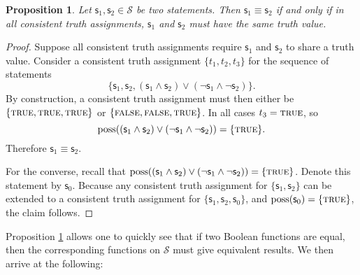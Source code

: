 \documentclass[psamsfonts]{amsart}
\newtheorem{prop}[thm]{Proposition}
\theoremstyle{definition}
\theoremstyle{remark}
\numberwithin{equation}{section}
\DeclareMathOperator{\possFn}{poss}
\def\TRUE{\textsc{true}}
\def\FALSE{\textsc{false}}
\def\AND{\wedge}
\def\OR{\vee}
\def\NOT{\neg}
\newcommand{\stmt}[1][s] {\mathsf{#1}}
\begin{document}
\begin{prop}\label{prop_equivalent_is_iff}
	Let $\stmt_1, \stmt_2 \in \mathcal{S}$ be two statements. Then $\stmt_1\equiv\stmt_2$ if and only if in all consistent truth assignments, $\stmt_1$ and $\stmt_2$ must have the same truth value.
\end{prop}

\begin{proof}
Suppose all consistent truth assignments require $\stmt_1$ and $\stmt_2$ to share a truth value. Consider a consistent truth assignment $\{t_1, t_2, t_3\}$ for the sequence of statements $$\{\stmt_1, \stmt_2, (\stmt_1 \AND \stmt_2) \OR (\NOT\stmt_1 \AND \NOT\stmt_2)\}.$$ By construction, a consistent truth assignment must then either be $\{\TRUE, \TRUE, \TRUE\}$ or $\{\FALSE, \FALSE, \TRUE\}$. In all cases $t_3=\TRUE$, so $$\possFn((\stmt_1 \AND \stmt_2) \OR (\NOT\stmt_1 \AND \NOT\stmt_2)) = \{\TRUE\}.$$ Therefore $\stmt_1 \equiv \stmt_2$.

For the converse, recall that $\possFn((\stmt_1 \AND \stmt_2) \OR (\NOT\stmt_1 \AND \NOT\stmt_2)) = \{\TRUE\}$. Denote this statement by $\stmt_0$. Because any consistent truth assignment for $\{\stmt_1,\stmt_2\}$ can be extended to a consistent truth assignment for $\{\stmt_1,\stmt_2,\stmt_0\}$, and $\possFn(\stmt_0)=\{\TRUE\}$, the claim follows. 
\end{proof}

Proposition \ref{prop_equivalent_is_iff} allows one to quickly see that if two Boolean functions are equal, then the corresponding functions on $\mathcal{S}$ must give equivalent results. We then arrive at the following:
\end{document}
